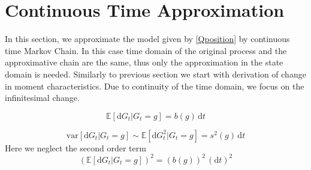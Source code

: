 \section{Continuous Time Approximation}

In this section, we approximate the model given by \eqref{Qposition} by continuous time Markov Chain. In this case time domain of the original process and the approximative chain are the same, thus only the approximation in the state domain is needed. Similarly to previous section we start with derivation of change in moment characteristics. Due to continuity of the time domain, we focus on the infinitesimal change.

\begin{equation}
\label{EOrgC}
\mathbb{E}[\mathrm{d}G_t|G_{t}=g]= b(g)\,\mathrm{d}t
\end{equation}

\begin{equation}
\label{VarOrgC}
\text{var}[\mathrm{d}G_t|G_{t}=g]\sim\mathbb{E}[\mathrm{d}G_t^2|G_{t}=g]= s^{2}(g)\,\mathrm{d}t
\end{equation}
Here we neglect the second order term %
\[(\mathbb{E}[\mathrm{d}G_t|G_{t}=g])^2= (b(g))^2\,(\mathrm{d}t)^2\]

